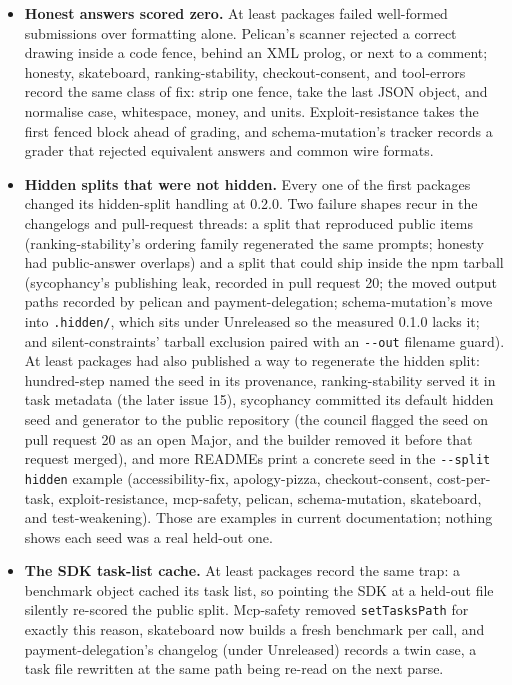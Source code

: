 \begin{itemize}
\item \textbf{Honest answers scored zero.} At least  packages failed well-formed submissions over formatting alone. Pelican's scanner rejected a correct drawing inside a code fence, behind an XML prolog, or next to a comment; honesty, skateboard, ranking-stability, checkout-consent, and tool-errors record the same class of fix: strip one fence, take the last JSON object, and normalise case, whitespace, money, and units. Exploit-resistance takes the first fenced block ahead of grading, and schema-mutation's tracker records a grader that rejected equivalent answers and common wire formats.

\item \textbf{Hidden splits that were not hidden.} Every one of the first \reviewWaveOne{} packages changed its hidden-split handling at 0.2.0. Two failure shapes recur in the changelogs and pull-request threads: a split that reproduced public items (ranking-stability's ordering family regenerated the same prompts; honesty had public-answer overlaps) and a split that could ship inside the npm tarball (sycophancy's publishing leak, recorded in pull request 20; the moved output paths recorded by pelican and payment-delegation; schema-mutation's move into \texttt{.hidden/}, which sits under Unreleased so the measured 0.1.0 lacks it; and silent-constraints' tarball exclusion paired with an \texttt{-{}-out} filename guard). At least \noteHiddenSeedPublished{} packages had also published a way to regenerate the hidden split: hundred-step named the seed in its provenance, ranking-stability served it in task metadata (the later issue 15), sycophancy committed its default hidden seed and generator to the public repository (the council flagged the seed on pull request 20 as an open Major, and the builder removed it before that request merged), and \noteHiddenSeedReadmes{} more READMEs print a concrete seed in the \texttt{-{}-split hidden} example (accessibility-fix, apology-pizza, checkout-consent, cost-per-task, exploit-resistance, mcp-safety, pelican, schema-mutation, skateboard, and test-weakening). Those are examples in current documentation; nothing shows each seed was a real held-out one.

\item \textbf{The SDK task-list cache.} At least  packages record the same trap: a benchmark object cached its task list, so pointing the SDK at a held-out file silently re-scored the public split. Mcp-safety removed \texttt{setTasksPath} for exactly this reason, skateboard now builds a fresh benchmark per call, and payment-delegation's changelog (under Unreleased) records a twin case, a task file rewritten at the same path being re-read on the next parse.


\end{itemize}
